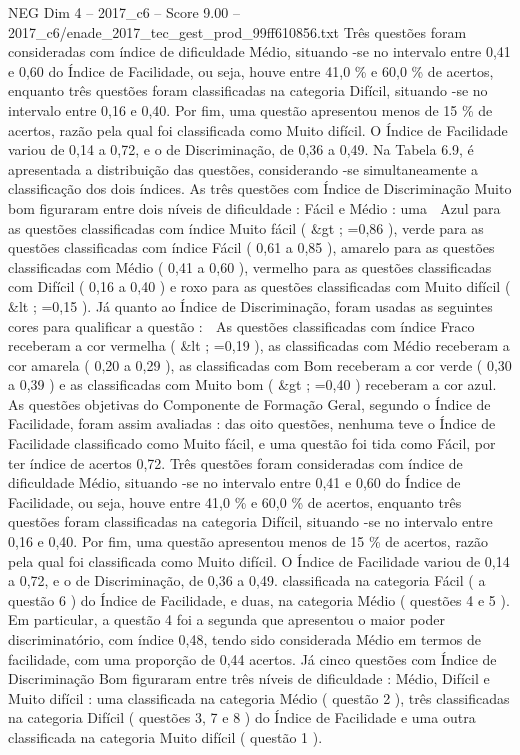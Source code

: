 \begin{textsample}{NEG Dim 4 – 2017\_c6 – Score 9.00 – 2017\_c6/enade\_2017\_tec\_gest\_prod\_99ff610856.txt}
Três questões foram consideradas com índice de dificuldade Médio, situando -se no intervalo entre 0,41 e 0,60 do Índice de Facilidade, ou seja, houve entre 41,0 \% e 60,0 \% de acertos, enquanto três questões foram classificadas na categoria Difícil, situando -se no intervalo entre 0,16 e 0,40.
Por fim, uma questão apresentou menos de 15 \% de acertos, razão pela qual foi classificada como Muito difícil.
O Índice de Facilidade variou de 0,14 a 0,72, e o de Discriminação, de 0,36 a 0,49.
Na Tabela 6.9, é apresentada a distribuição das questões, considerando -se simultaneamente a classificação dos dois índices.
As três questões com Índice de Discriminação Muito bom figuraram entre dois níveis de dificuldade : Fácil e Médio : uma  Azul para as questões classificadas com índice Muito fácil ( \&gt ; =0,86 ), verde para as questões classificadas com índice Fácil ( 0,61 a 0,85 ), amarelo para as questões classificadas com Médio ( 0,41 a 0,60 ), vermelho para as questões classificadas com Difícil ( 0,16 a 0,40 ) e roxo para as questões classificadas com Muito difícil ( \&lt ; =0,15 ).
Já quanto ao Índice de Discriminação, foram usadas as seguintes cores para qualificar a questão :  As questões classificadas com índice Fraco receberam a cor vermelha ( \&lt ; =0,19 ), as classificadas com Médio receberam a cor amarela ( 0,20 a 0,29 ), as classificadas com Bom receberam a cor verde ( 0,30 a 0,39 ) e as classificadas com Muito bom ( \&gt ; =0,40 ) receberam a cor azul.
As questões objetivas do Componente de Formação Geral, segundo o Índice de Facilidade, foram assim avaliadas : das oito questões, nenhuma teve o Índice de Facilidade classificado como Muito fácil, e uma questão foi tida como Fácil, por ter índice de acertos 0,72.
Três questões foram consideradas com índice de dificuldade Médio, situando -se no intervalo entre 0,41 e 0,60 do Índice de Facilidade, ou seja, houve entre 41,0 \% e 60,0 \% de acertos, enquanto três questões foram classificadas na categoria Difícil, situando -se no intervalo entre 0,16 e 0,40.
Por fim, uma questão apresentou menos de 15 \% de acertos, razão pela qual foi classificada como Muito difícil.
O Índice de Facilidade variou de 0,14 a 0,72, e o de Discriminação, de 0,36 a 0,49. classificada na categoria Fácil ( a questão 6 ) do Índice de Facilidade, e duas, na categoria Médio ( questões 4 e 5 ).
Em particular, a questão 4 foi a segunda que apresentou o maior poder discriminatório, com índice 0,48, tendo sido considerada Médio em termos de facilidade, com uma proporção de 0,44 acertos.
Já cinco questões com Índice de Discriminação Bom figuraram entre três níveis de dificuldade : Médio, Difícil e Muito difícil : uma classificada na categoria Médio ( questão 2 ), três classificadas na categoria Difícil ( questões 3, 7 e 8 ) do Índice de Facilidade e uma outra classificada na categoria Muito difícil ( questão 1 ).

\end{textsample}
